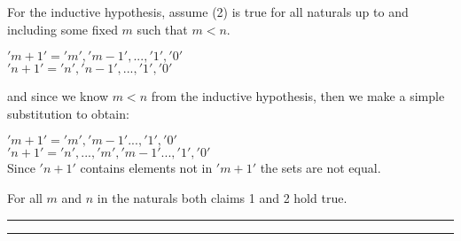 \documentclass[11pt,letterpaper]{article}
\newcommand{\question}[1] {\vspace{.25in} \hrule\vspace{0.5em}
\noindent{\bf #1} \vspace{0.5em}
\hrule \vspace{.10in}}
\begin{document}
For the inductive hypothesis, assume (2) is true for all naturals up to and including some fixed $m$ such that $m < n$.

$'m+1' = {'m','m-1', ..., '1', '0'}$\\
$'n+1' = {'n','n-1', ..., '1', '0'}$

and since we know $m<n$ from the inductive hypothesis, then we make a simple substitution to obtain:

$'m+1' = {'m','m-1' ..., '1', '0'}$\\
$'n+1' = {'n',...,'m','m-1' ..., '1', '0'}$\\

Since $'n+1'$ contains elements not in $'m+1'$ the sets are not equal.

For all $m$ and $n$ in the naturals both claims 1 and 2 hold true.


\question{4}
\end{document}
